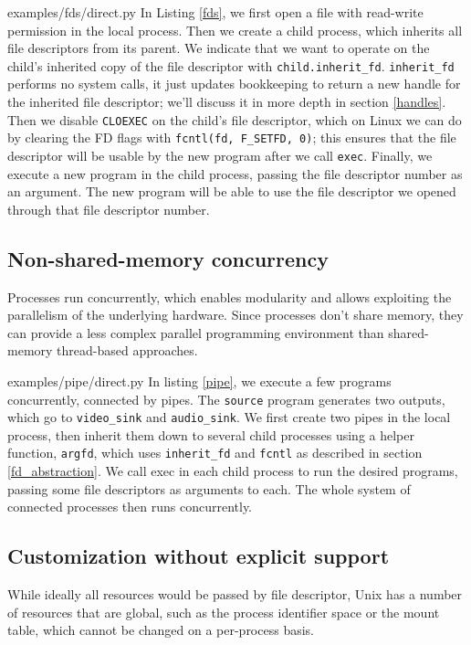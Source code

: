 \documentclass[letterpaper,twocolumn,10pt]{article}
\begin{document}

{examples/fds/direct.py}
In Listing \ref{fds},
we first open a file with read-write permission in the local process.
Then we create a child process,
which inherits all file descriptors from its parent.
We indicate that we want to operate on the child's inherited copy of the file descriptor with \verb|child.inherit_fd|.
\texttt{inherit\_fd} performs no system calls,
it just updates bookkeeping to return a new handle for the inherited file descriptor;
we'll discuss it in more depth in section \ref{handles}.
Then we disable \texttt{CLOEXEC} on the child's file descriptor,
which on Linux we can do by clearing the FD flags with \verb|fcntl(fd, F_SETFD, 0)|;
this ensures that the file descriptor will be usable by the new program after we call \texttt{exec}.
Finally, we execute a new program in the child process,
passing the file descriptor number as an argument.
The new program will be able to use the file descriptor we opened through that file descriptor number.
\subsection{Non-shared-memory concurrency}
Processes run concurrently,
which enables modularity
and allows exploiting the parallelism of the underlying hardware.
Since processes don't share memory,
they can provide a less complex parallel programming environment
than shared-memory thread-based approaches.\cite{threads}


{examples/pipe/direct.py}
In listing \ref{pipe},
we execute a few programs concurrently,
connected by pipes.
The \texttt{source} program generates two outputs, which go to \texttt{video\_sink} and \texttt{audio\_sink}.
We first create two pipes in the local process,
then inherit them down to several child processes using a helper function, \verb|argfd|,
which uses \verb|inherit_fd| and \texttt{fcntl} as described in section \ref{fd_abstraction}.
We call exec in each child process to run the desired programs,
passing some file descriptors as arguments to each.
The whole system of connected processes then runs concurrently.
\subsection{Customization without explicit support}
While ideally all resources would be passed by file descriptor,
Unix has a number of resources that are global,
such as the process identifier space or the mount table,
which cannot be changed on a per-process basis.\cite{capsicum}
\end{document}
